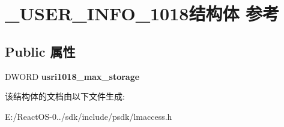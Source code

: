 \hypertarget{struct___u_s_e_r___i_n_f_o__1018}{}\section{\+\_\+\+U\+S\+E\+R\+\_\+\+I\+N\+F\+O\+\_\+1018结构体 参考}
\label{struct___u_s_e_r___i_n_f_o__1018}
\subsection*{Public 属性}
\begin{DoxyCompactItemize}
\item 
\mbox{\label{struct___u_s_e_r___i_n_f_o__1018_ad8f5bec1c8fa3ae9f876a6cd6c5d13b5}} 
D\+W\+O\+RD {\bfseries usri1018\+\_\+max\+\_\+storage}
\end{DoxyCompactItemize}


该结构体的文档由以下文件生成\+:\begin{DoxyCompactItemize}
\item 
E\+:/\+React\+O\+S-\/0../sdk/include/psdk/lmaccess.\+h\end{DoxyCompactItemize}
